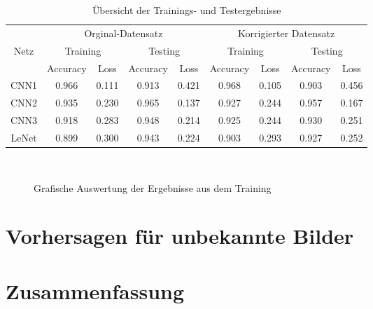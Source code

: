 \begin{table} [ht]
	\begin{tabular}{|c|cc|cc||cc|cc|}
		\hline 
		 & \multicolumn{4}{|c||}{Orginal-Datensatz} & \multicolumn{4}{|c|}{Korrigierter Datensatz} \\ 
		Netz & \multicolumn{2}{|c|}{Training} & \multicolumn{2}{|c||}{Testing} & \multicolumn{2}{|c|}{Training} & \multicolumn{2}{|c|}{Testing} \\
		  & Accuracy & Loss & Accuracy & Loss & Accuracy & Loss & Accuracy & Loss \\ \hline 
		  CNN1 & 0.966 & 0.111 & 0.913 & 0.421 & 0.968 & 0.105 & 0.903 & 0.456 \\
		  CNN2 & 0.935 & 0.230 & 0.965 & 0.137 & 0.927 & 0.244 & 0.957 & 0.167 \\
		  CNN3 & 0.918 & 0.283 & 0.948 & 0.214 & 0.925 & 0.244 & 0.930 & 0.251 \\
		  LeNet& 0.899 & 0.300 & 0.943 & 0.224 & 0.903 & 0.293 & 0.927 & 0.252 \\ \hline
		 
	\end{tabular}
	\caption{Übersicht der Trainings- und Testergebnisse} \label{tab:ergebnisse}
\end{table}

\begin{figure} [!ht]
	\centering
	\\
	\caption{Grafische Auswertung der Ergebnisse aus dem Training} \label{pic:figs}
\end{figure}


\section{Vorhersagen für unbekannte Bilder}

\section{Zusammenfassung}

